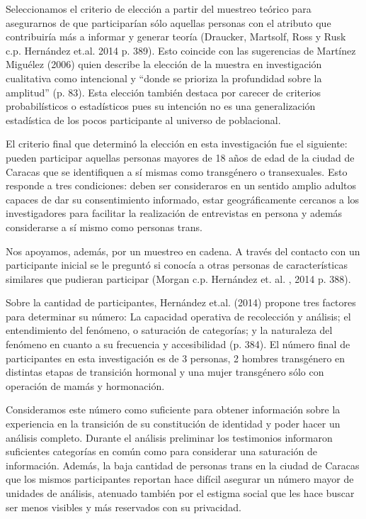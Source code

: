 Seleccionamos el criterio de elección a partir del muestreo teórico para
asegurarnos de que participarían sólo aquellas personas con el atributo que
contribuiría más a informar y generar teoría (Draucker, Martsolf, Ross y Rusk
c.p. Hernández et.al. 2014 p. 389).
Esto coincide con las sugerencias de Martínez Miguélez (2006) quien describe la
elección de la muestra en investigación cualitativa como intencional y “donde se
prioriza la profundidad sobre la amplitud” (p. 83).
Esta elección también destaca por carecer de criterios probabilísticos o
estadísticos pues su intención no es una generalización estadística de los pocos
participante al universo de poblacional.

El criterio final que determinó la elección en esta investigación fue el
siguiente: pueden participar aquellas personas mayores de 18 años de edad de la
ciudad de Caracas que se identifiquen a sí mismas como transgénero o
transexuales.
Esto responde a tres condiciones: deben ser consideraros en un sentido amplio
adultos capaces de dar su consentimiento informado, estar geográficamente
cercanos a los investigadores para facilitar la realización de entrevistas en
persona y además considerarse a sí mismo como personas trans.

Nos apoyamos, además, por un muestreo en cadena.
A través del contacto con un participante inicial se le preguntó si conocía a
otras personas de características similares que pudieran participar (Morgan c.p.
Hernández et. al. , 2014 p. 388).

Sobre la cantidad de participantes, Hernández et.al. (2014) propone tres
factores para determinar su número: La capacidad operativa de recolección y
análisis; el entendimiento del fenómeno, o saturación de categorías; y la
naturaleza del fenómeno en cuanto a su frecuencia y accesibilidad (p. 384).
El número final de participantes en esta investigación es de 3 personas, 2
hombres transgénero en distintas etapas de transición hormonal y una mujer
transgénero sólo con operación de mamás y hormonación.

Consideramos este número como suficiente para obtener información sobre la
experiencia en la transición de su constitución de identidad y poder hacer un
análisis completo.
Durante el análisis preliminar los testimonios informaron
suficientes categorías en común como para considerar una saturación de
información.
Además, la baja cantidad de personas trans en la ciudad de Caracas
que los mismos participantes reportan hace difícil asegurar un número mayor de
unidades de análisis, atenuado también por el estigma social que les hace buscar
ser menos visibles y más reservados con su privacidad.

